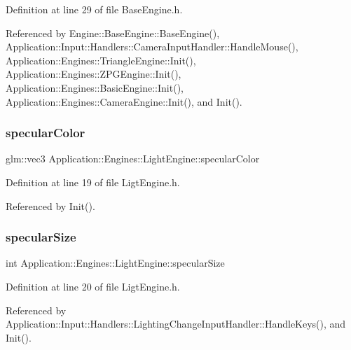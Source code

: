 Definition at line 29 of file Base\+Engine.\+h.



Referenced by Engine\+::\+Base\+Engine\+::\+Base\+Engine(), Application\+::\+Input\+::\+Handlers\+::\+Camera\+Input\+Handler\+::\+Handle\+Mouse(), Application\+::\+Engines\+::\+Triangle\+Engine\+::\+Init(), Application\+::\+Engines\+::\+Z\+P\+G\+Engine\+::\+Init(), Application\+::\+Engines\+::\+Basic\+Engine\+::\+Init(), Application\+::\+Engines\+::\+Camera\+Engine\+::\+Init(), and Init().

\mbox{\label{classApplication_1_1Engines_1_1LightEngine_ae03347f7ed935e951726dffba52d0fef}} 
\subsubsection{\texorpdfstring{specular\+Color}{specularColor}}
{\footnotesize\ttfamily glm\+::vec3 Application\+::\+Engines\+::\+Light\+Engine\+::specular\+Color}



Definition at line 19 of file Ligt\+Engine.\+h.



Referenced by Init().

\mbox{\label{classApplication_1_1Engines_1_1LightEngine_a5da28beed5c8d278c3615974d464f246}} 
\subsubsection{\texorpdfstring{specular\+Size}{specularSize}}
{\footnotesize\ttfamily int Application\+::\+Engines\+::\+Light\+Engine\+::specular\+Size}



Definition at line 20 of file Ligt\+Engine.\+h.



Referenced by Application\+::\+Input\+::\+Handlers\+::\+Lighting\+Change\+Input\+Handler\+::\+Handle\+Keys(), and Init().

